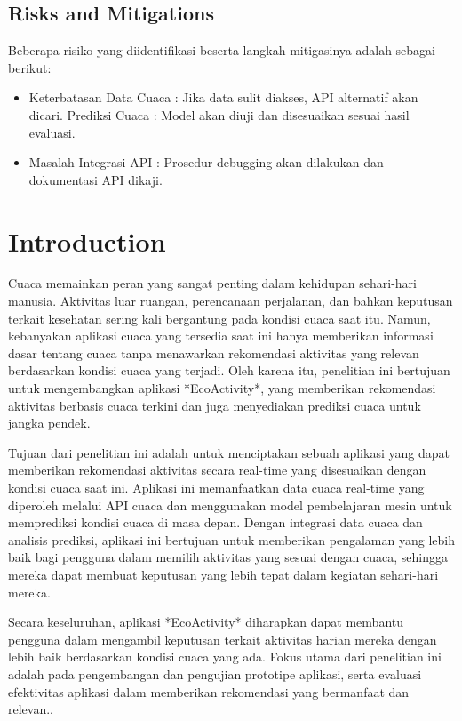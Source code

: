 \documentclass[journal,article,submit,pdftex,moreauthors]{Definitions/mdpi}
\begin{document}
\subsection{Risks and Mitigations}

Beberapa risiko yang diidentifikasi beserta langkah mitigasinya adalah sebagai berikut:
\begin{itemize}
    \item Keterbatasan Data Cuaca : Jika data sulit diakses, API alternatif akan dicari.
    \itemKetidakakuratan Prediksi Cuaca : Model akan diuji dan disesuaikan sesuai hasil evaluasi.
    \item Masalah Integrasi API : Prosedur debugging akan dilakukan dan dokumentasi API dikaji.
\end{itemize}
\section{Introduction}

Cuaca memainkan peran yang sangat penting dalam kehidupan sehari-hari manusia. Aktivitas luar ruangan, perencanaan perjalanan, dan bahkan keputusan terkait kesehatan sering kali bergantung pada kondisi cuaca saat itu. Namun, kebanyakan aplikasi cuaca yang tersedia saat ini hanya memberikan informasi dasar tentang cuaca tanpa menawarkan rekomendasi aktivitas yang relevan berdasarkan kondisi cuaca yang terjadi. Oleh karena itu, penelitian ini bertujuan untuk mengembangkan aplikasi *EcoActivity*, yang memberikan rekomendasi aktivitas berbasis cuaca terkini dan juga menyediakan prediksi cuaca untuk jangka pendek.

Tujuan dari penelitian ini adalah untuk menciptakan sebuah aplikasi yang dapat memberikan rekomendasi aktivitas secara real-time yang disesuaikan dengan kondisi cuaca saat ini. Aplikasi ini memanfaatkan data cuaca real-time yang diperoleh melalui API cuaca dan menggunakan model pembelajaran mesin untuk memprediksi kondisi cuaca di masa depan. Dengan integrasi data cuaca dan analisis prediksi, aplikasi ini bertujuan untuk memberikan pengalaman yang lebih baik bagi pengguna dalam memilih aktivitas yang sesuai dengan cuaca, sehingga mereka dapat membuat keputusan yang lebih tepat dalam kegiatan sehari-hari mereka.

Secara keseluruhan, aplikasi *EcoActivity* diharapkan dapat membantu pengguna dalam mengambil keputusan terkait aktivitas harian mereka dengan lebih baik berdasarkan kondisi cuaca yang ada. Fokus utama dari penelitian ini adalah pada pengembangan dan pengujian prototipe aplikasi, serta evaluasi efektivitas aplikasi dalam memberikan rekomendasi yang bermanfaat dan relevan..
\end{document}
